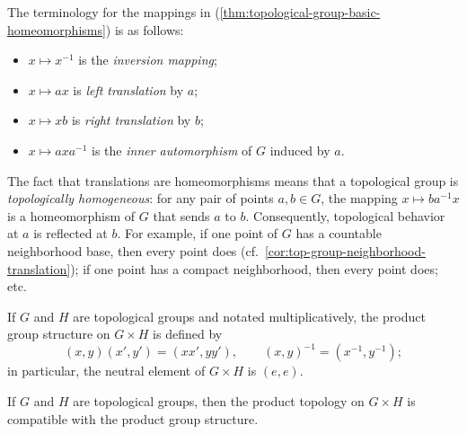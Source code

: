 \begin{remark}
    \label{rem:top-group-translations-terminology}

    The terminology for the mappings in (\ref{thm:topological-group-basic-homeomorphisms}) is as follows:
    \begin{itemize}
        \item \( x \mapsto x^{-1} \) is the \emph{inversion mapping};
        \item \( x \mapsto ax \) is \emph{left translation} by \( a \);
        \item \( x \mapsto xb \) is \emph{right translation} by \( b \);
        \item \( x \mapsto axa^{-1} \) is the \emph{inner automorphism} of \( G \) induced by \( a \).
    \end{itemize}

    The fact that translations are homeomorphisms means that a topological group is \emph{topologically homogeneous}:
    for any pair of points \( a, b \in G \), the mapping \( x \mapsto ba^{-1}x \) is a homeomorphism of \( G \) that sends \( a \) to \( b \).
    Consequently, topological behavior at \( a \) is reflected at \( b \).
    For example, if one point of \( G \) has a countable neighborhood base, then every point does (cf.\ \ref{cor:top-group-neighborhood-translation});
    if one point has a compact neighborhood, then every point does; etc.
\end{remark}

If \( G \) and \( H \) are topological groups and notated multiplicatively, the product group structure on \( G \times H \) is defined by
\[
    (x, y)(x', y') = (xx', yy'),
    \qquad
    (x, y)^{-1} = (x^{-1}, y^{-1});
\]
in particular, the neutral element of \( G \times H \) is \( (e, e) \).


\begin{theorem}
    \label{thm:product-topological-groups}

    If \( G \) and \( H \) are topological groups, then the product topology on \( G \times H \) is compatible with the product group structure.
\end{theorem}

